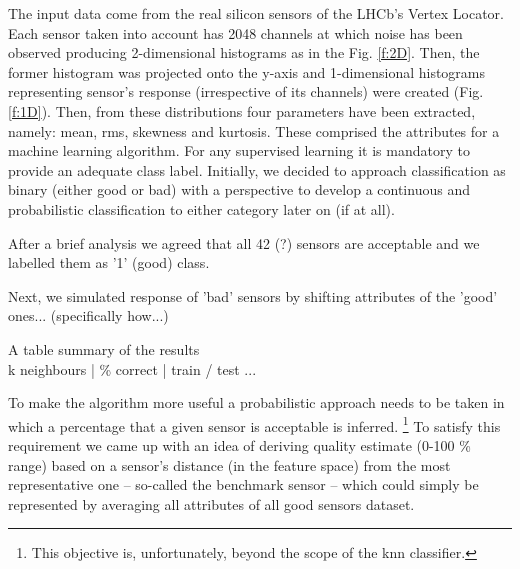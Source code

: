\documentclass[a4paper,10pt]{article}
\begin{document}
The input data come from the real silicon sensors of the LHCb's Vertex Locator. Each sensor taken into account has 2048 channels at which noise has been observed producing 2-dimensional histograms as in the Fig. \ref{f:2D}. Then, the former histogram was projected onto the y-axis and 1-dimensional histograms representing sensor's response (irrespective of its channels) were created (Fig. \ref{f:1D}). Then, from these distributions four parameters have been extracted, namely: mean, rms, skewness and kurtosis. These comprised the attributes for a machine learning algorithm. For any supervised learning it is mandatory to provide an adequate class label. Initially, we decided to approach classification as binary (either good or bad) with a perspective to develop a continuous and probabilistic classification to either category later on (if at all).


After a brief analysis we agreed that all 42 (?) sensors are acceptable and we labelled them as '1' (good) class.


Next, we simulated response of 'bad' sensors by shifting attributes of the 'good' ones... (specifically how...)

A table summary of the results \\
k neighbours | \% correct | train / test ...

To make the algorithm more useful a probabilistic approach needs to be taken in which a percentage that a given sensor is acceptable is inferred.
\footnote{This objective is, unfortunately, beyond the scope of the knn classifier.}
To satisfy this requirement we came up with an idea of deriving quality estimate (0-100 \% range) based on a sensor's distance (in the feature space) from the most representative one -- so-called the benchmark sensor -- which could simply be represented by averaging all attributes of all good sensors dataset.

\end{document}

